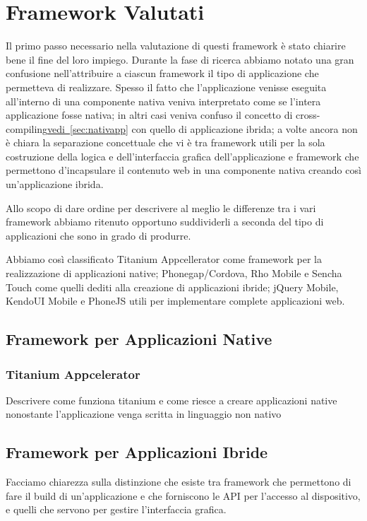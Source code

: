\chapter{Framework Valutati}
	Il primo passo necessario nella valutazione di questi framework è stato 
	chiarire bene il fine del loro impiego. Durante la fase di ricerca abbiamo 
	notato una gran confusione nell'attribuire a ciascun framework il tipo di
	applicazione che permetteva di realizzare. Spesso il fatto che 
	l'applicazione venisse eseguita all'interno di una componente nativa veniva 
	interpretato come se l'intera applicazione fosse nativa; in altri casi 
	veniva confuso il concetto di 
	cross-compiling\hyperref[sec:nativapp]{vedi~\ref{sec:nativapp}} con quello 
	di applicazione ibrida; a volte ancora non è chiara la separazione 
	concettuale che vi è tra framework utili per la sola costruzione della 
	logica e dell'interfaccia grafica dell'applicazione e framework che 
	permettono d'incapsulare il contenuto web in una componente nativa creando 
	così un'applicazione ibrida.
	
	Allo scopo di dare ordine per descrivere al meglio le differenze tra i vari 
	framework abbiamo ritenuto opportuno suddividerli a seconda del tipo di 
	applicazioni che sono in grado di produrre.
	
	Abbiamo così classificato Titanium Appcellerator come framework per la 
	realizzazione di applicazioni native; Phonegap/Cordova, Rho Mobile e Sencha 
	Touch come quelli dediti alla creazione di applicazioni ibride; jQuery 
	Mobile, KendoUI Mobile e PhoneJS utili per implementare complete 
	applicazioni web.

	\section{Framework per Applicazioni Native}
	
		\subsection{Titanium Appcelerator}
		\label{sec:titanium}
			Descrivere come funziona titanium e come riesce a creare
			applicazioni native nonostante l'applicazione venga scritta in
			linguaggio non nativo
			
	\section{Framework per Applicazioni Ibride}
		Facciamo chiarezza sulla distinzione che esiste tra framework che
		permettono di fare il build di un'applicazione e che forniscono le API
		per l'accesso al dispositivo, e quelli che servono per gestire
		l'interfaccia grafica.
	
